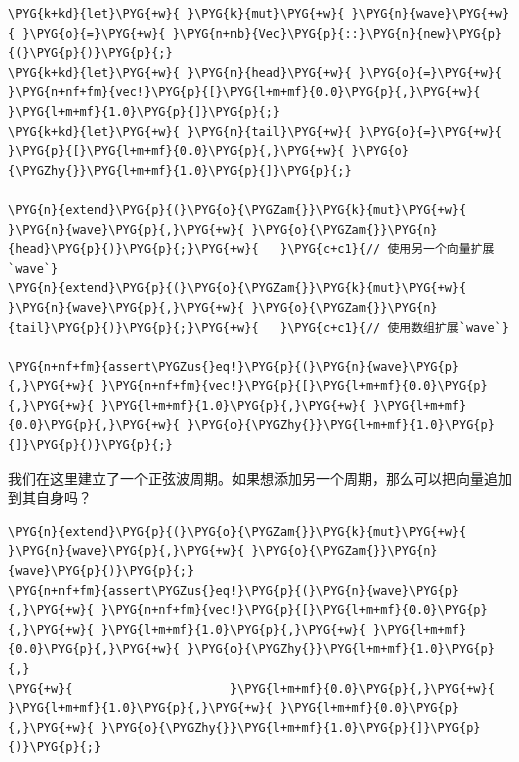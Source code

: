 \begin{Verbatim}[commandchars=\\\{\},breaklines=true,breakanywhere=true,fontsize=\codefont,xleftmargin=17bp]
\PYG{k+kd}{let}\PYG{+w}{ }\PYG{k}{mut}\PYG{+w}{ }\PYG{n}{wave}\PYG{+w}{ }\PYG{o}{=}\PYG{+w}{ }\PYG{n+nb}{Vec}\PYG{p}{::}\PYG{n}{new}\PYG{p}{(}\PYG{p}{)}\PYG{p}{;}
\PYG{k+kd}{let}\PYG{+w}{ }\PYG{n}{head}\PYG{+w}{ }\PYG{o}{=}\PYG{+w}{ }\PYG{n+nf+fm}{vec!}\PYG{p}{[}\PYG{l+m+mf}{0.0}\PYG{p}{,}\PYG{+w}{ }\PYG{l+m+mf}{1.0}\PYG{p}{]}\PYG{p}{;}
\PYG{k+kd}{let}\PYG{+w}{ }\PYG{n}{tail}\PYG{+w}{ }\PYG{o}{=}\PYG{+w}{ }\PYG{p}{[}\PYG{l+m+mf}{0.0}\PYG{p}{,}\PYG{+w}{ }\PYG{o}{\PYGZhy{}}\PYG{l+m+mf}{1.0}\PYG{p}{]}\PYG{p}{;}

\PYG{n}{extend}\PYG{p}{(}\PYG{o}{\PYGZam{}}\PYG{k}{mut}\PYG{+w}{ }\PYG{n}{wave}\PYG{p}{,}\PYG{+w}{ }\PYG{o}{\PYGZam{}}\PYG{n}{head}\PYG{p}{)}\PYG{p}{;}\PYG{+w}{   }\PYG{c+c1}{// 使用另一个向量扩展`wave`}
\PYG{n}{extend}\PYG{p}{(}\PYG{o}{\PYGZam{}}\PYG{k}{mut}\PYG{+w}{ }\PYG{n}{wave}\PYG{p}{,}\PYG{+w}{ }\PYG{o}{\PYGZam{}}\PYG{n}{tail}\PYG{p}{)}\PYG{p}{;}\PYG{+w}{   }\PYG{c+c1}{// 使用数组扩展`wave`}

\PYG{n+nf+fm}{assert\PYGZus{}eq!}\PYG{p}{(}\PYG{n}{wave}\PYG{p}{,}\PYG{+w}{ }\PYG{n+nf+fm}{vec!}\PYG{p}{[}\PYG{l+m+mf}{0.0}\PYG{p}{,}\PYG{+w}{ }\PYG{l+m+mf}{1.0}\PYG{p}{,}\PYG{+w}{ }\PYG{l+m+mf}{0.0}\PYG{p}{,}\PYG{+w}{ }\PYG{o}{\PYGZhy{}}\PYG{l+m+mf}{1.0}\PYG{p}{]}\PYG{p}{)}\PYG{p}{;}
\end{Verbatim}

我们在这里建立了一个正弦波周期。如果想添加另一个周期，那么可以把向量追加到其自身吗？

\begin{Verbatim}[commandchars=\\\{\},breaklines=true,breakanywhere=true,fontsize=\codefont,xleftmargin=17bp]
\PYG{n}{extend}\PYG{p}{(}\PYG{o}{\PYGZam{}}\PYG{k}{mut}\PYG{+w}{ }\PYG{n}{wave}\PYG{p}{,}\PYG{+w}{ }\PYG{o}{\PYGZam{}}\PYG{n}{wave}\PYG{p}{)}\PYG{p}{;}
\PYG{n+nf+fm}{assert\PYGZus{}eq!}\PYG{p}{(}\PYG{n}{wave}\PYG{p}{,}\PYG{+w}{ }\PYG{n+nf+fm}{vec!}\PYG{p}{[}\PYG{l+m+mf}{0.0}\PYG{p}{,}\PYG{+w}{ }\PYG{l+m+mf}{1.0}\PYG{p}{,}\PYG{+w}{ }\PYG{l+m+mf}{0.0}\PYG{p}{,}\PYG{+w}{ }\PYG{o}{\PYGZhy{}}\PYG{l+m+mf}{1.0}\PYG{p}{,}
\PYG{+w}{                      }\PYG{l+m+mf}{0.0}\PYG{p}{,}\PYG{+w}{ }\PYG{l+m+mf}{1.0}\PYG{p}{,}\PYG{+w}{ }\PYG{l+m+mf}{0.0}\PYG{p}{,}\PYG{+w}{ }\PYG{o}{\PYGZhy{}}\PYG{l+m+mf}{1.0}\PYG{p}{]}\PYG{p}{)}\PYG{p}{;}
\end{Verbatim}

